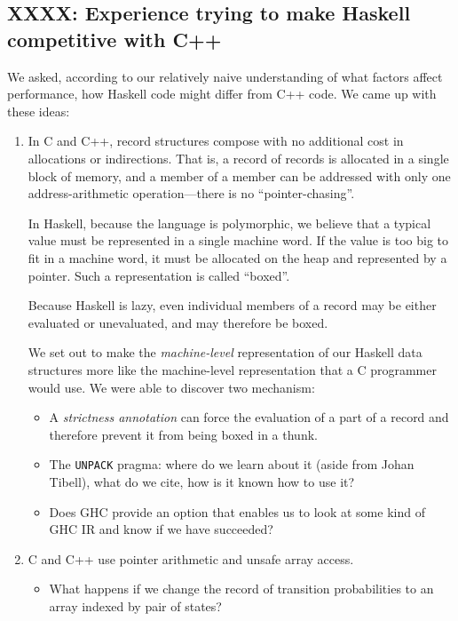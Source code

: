 \subsection{XXXX: Experience trying to make Haskell competitive with
C++}

We asked, according to our relatively naive understanding of what
factors affect performance, how Haskell code might differ from C++ code.
We came up with these ideas:

\begin{enumerate}[1.]
\item
  In C and C++, record structures compose with no additional cost in
  allocations or indirections. That is, a record of records is allocated
  in a single block of memory, and a member of a member can be addressed
  with only one address-arithmetic operation---there is no
  ``pointer-chasing''.

  In Haskell, because the language is polymorphic, we believe that a
  typical value must be represented in a single machine word. If the
  value is too big to fit in a machine word, it must be allocated on the
  heap and represented by a pointer. Such a representation is called
  ``boxed''.

  Because Haskell is lazy, even individual members of a record may be
  either evaluated or unevaluated, and may therefore be boxed.

  We set out to make the \emph{machine-level} representation of our
  Haskell data structures more like the machine-level representation
  that a C programmer would use. We were able to discover two mechanism:

  \begin{itemize}
  \item
    A \emph{strictness annotation} can force the evaluation of a part of
    a record and therefore prevent it from being boxed in a thunk.
  \item
    The \texttt{UNPACK} pragma: where do we learn about it (aside from
    Johan Tibell), what do we cite, how is it known how to use it?
  \item
    Does GHC provide an option that enables us to look at some kind of
    GHC IR and know if we have succeeded?
  \end{itemize}
\item
  C and C++ use pointer arithmetic and unsafe array access.

  \begin{itemize}
  \item
    What happens if we change the record of transition probabilities to
    an array indexed by pair of states?


\end{itemize}
\end{enumerate}
